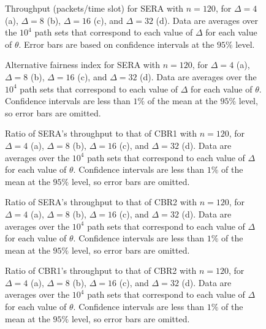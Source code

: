 \documentclass{article}
\begin{document}
\begin{figure}[p]
\centering
{}
\caption[Throughput (packets/time slot) for SERA]{Throughput (packets/time slot)
for SERA with $n=120$, for $\Delta=4$ (a), $\Delta=8$ (b), $\Delta=16$ (c), and
$\Delta=32$ (d). Data are averages over the $10^4$ path sets that correspond to
each value of $\Delta$ for each value of $\theta$. Error bars are based on
confidence intervals at the $95\%$ level.}
\label{figureS3}
\end{figure}

\begin{figure}[p]
\centering
{}
\caption[Alternative fairness index for SERA]{Alternative fairness index for
SERA with $n=120$, for $\Delta=4$ (a), $\Delta=8$ (b), $\Delta=16$ (c), and
$\Delta=32$ (d). Data are averages over the $10^4$ path sets that correspond to
each value of $\Delta$ for each value of $\theta$. Confidence intervals are
less than $1\%$ of the mean at the $95\%$ level, so error bars are omitted.}
\label{figureS4}
\end{figure}

\begin{figure}[p]
\centering
{}
\caption[Ratio of SERA's throughput to that of CBR1]{Ratio of SERA's throughput
to that of CBR1 with $n=120$, for $\Delta=4$ (a), $\Delta=8$ (b), $\Delta=16$
(c), and $\Delta=32$ (d). Data are averages over the $10^4$ path sets that
correspond to each value of $\Delta$ for each value of $\theta$. Confidence
intervals are less than $1\%$ of the mean at the $95\%$ level, so error bars are
omitted.}
\label{figureS5}
\end{figure}

\begin{figure}[p]
\centering
{}
\caption[Ratio of SERA's throughput to that of CBR2]{Ratio of SERA's throughput
to that of CBR2 with $n=120$, for $\Delta=4$ (a), $\Delta=8$ (b), $\Delta=16$
(c), and $\Delta=32$ (d). Data are averages over the $10^4$ path sets that
correspond to each value of $\Delta$ for each value of $\theta$. Confidence
intervals are less than $1\%$ of the mean at the $95\%$ level, so error bars are
omitted.}
\label{figureS6}
\end{figure}

\begin{figure}[p]
\centering
{}
\caption[Ratio of CBR1's throughput to that of CBR2]{Ratio of CBR1's throughput
to that of CBR2 with $n=120$, for $\Delta=4$ (a), $\Delta=8$ (b), $\Delta=16$
(c), and $\Delta=32$ (d). Data are averages over the $10^4$ path sets that
correspond to each value of $\Delta$ for each value of $\theta$. Confidence
intervals are less than $1\%$ of the mean at the $95\%$ level, so error bars are
omitted.}
\label{figureS7}
\end{figure}
\end{document}

